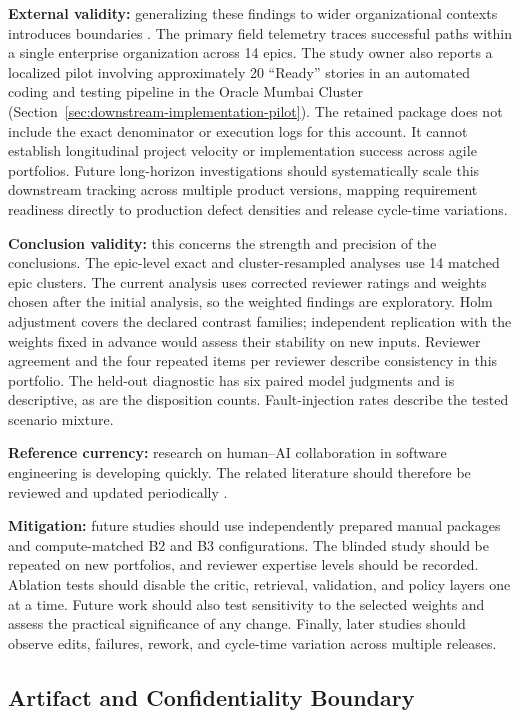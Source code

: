 \documentclass[pdflatex,sn-basic]{sn-jnl}
\begin{document}
\textbf{External validity:} generalizing these findings to wider organizational contexts introduces boundaries \citep{R71,R58}. The primary field telemetry traces successful paths within a single enterprise organization across 14 epics. The study owner also reports a localized pilot involving approximately 20 ``Ready'' stories in an automated coding and testing pipeline in the Oracle Mumbai Cluster (Section~\ref{sec:downstream-implementation-pilot}). The retained package does not include the exact denominator or execution logs for this account. It cannot establish longitudinal project velocity or implementation success across agile portfolios. Future long-horizon investigations should systematically scale this downstream tracking across multiple product versions, mapping requirement readiness directly to production defect densities and release cycle-time variations.

\textbf{Conclusion validity:} this concerns the strength and precision of the conclusions. The epic-level exact and cluster-resampled analyses use 14 matched epic clusters. The current analysis uses corrected reviewer ratings and weights chosen after the initial analysis, so the weighted findings are exploratory. Holm adjustment covers the declared contrast families; independent replication with the weights fixed in advance would assess their stability on new inputs. Reviewer agreement and the four repeated items per reviewer describe consistency in this portfolio. The held-out diagnostic has six paired model judgments and is descriptive, as are the disposition counts. Fault-injection rates describe the tested scenario mixture.

\textbf{Reference currency:} research on human--AI collaboration in software engineering is developing quickly. The related literature should therefore be reviewed and updated periodically \citep{R72}.

\textbf{Mitigation:} future studies should use independently prepared manual packages and compute-matched B2 and B3 configurations. The blinded study should be repeated on new portfolios, and reviewer expertise levels should be recorded. Ablation tests should disable the critic, retrieval, validation, and policy layers one at a time. Future work should also test sensitivity to the selected weights and assess the practical significance of any change. Finally, later studies should observe edits, failures, rework, and cycle-time variation across multiple releases.

\subsection{Artifact and Confidentiality Boundary}\label{sec:artifact-access}
\end{document}
